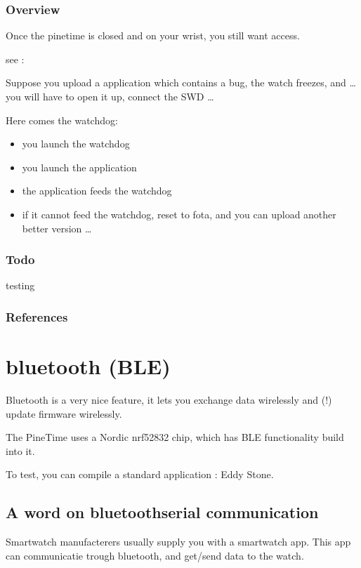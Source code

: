 \documentclass[letterpaper,10pt,english]{sphinxmanual}
\begin{document}
\subsection{Overview}
\label{\detokenize{drivers/watchdog:overview}}
Once the pinetime is closed and on your wrist, you still want access.

see : {\hyperref[\detokenize{fota/fota:fota}]{}}

Suppose you upload a application which contains a bug, the watch freezes, and … you will have to open it up, connect the SWD …

Here comes the watchdog:
\begin{itemize}
\item {} 
you launch the watchdog

\item {} 
you launch the application

\item {} 
the application feeds the watchdog

\item {} 
if it cannot feed the watchdog, reset to fota, and you can upload another better version …

\end{itemize}


\subsection{Todo}
\label{\detokenize{drivers/watchdog:todo}}
testing


\subsection{References}
\label{\detokenize{drivers/watchdog:references}}

\chapter{bluetooth (BLE)}
\label{\detokenize{bluetooth:bluetooth-ble}}\label{\detokenize{bluetooth::doc}}
Bluetooth is a very nice feature, it lets you exchange data wirelessly and (!) update firmware wirelessly.

The PineTime uses a Nordic nrf52832 chip, which has BLE functionality build into it.

To test, you can compile a standard application : Eddy Stone.


\section{A word on bluetooth\sphinxhyphen{}serial communication}
\label{\detokenize{bluetooth:a-word-on-bluetooth-serial-communication}}
Smartwatch manufacterers usually supply you with a smartwatch app.
This app can communicatie trough bluetooth, and get/send data to the watch.
\end{document}
